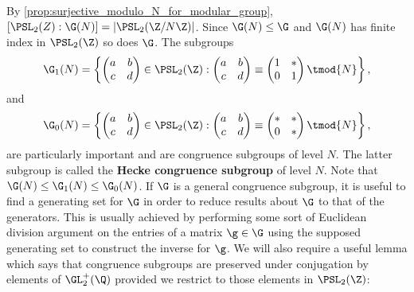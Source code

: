         By \cref{prop:surjective_modulo_N_for_modular_group}, $[\PSL_{2}(Z):\G(N)] = |\PSL_{2}(\Z/N\Z)|$. Since $\G(N) \le \G$ and $\G(N)$ has finite index in $\PSL_{2}(\Z)$ so does $\G$. The subgroups
      \[
        \G_{1}(N) = \left\{\begin{pmatrix} a & b \\ c & d \end{pmatrix} \in \PSL_{2}(\Z):\begin{pmatrix} a & b \\ c & d \end{pmatrix} \equiv \begin{pmatrix} 1 & \ast \\ 0 & 1 \end{pmatrix} \tmod{N}\right\},
      \]
      and
      \[
        \G_{0}(N) = \left\{\begin{pmatrix} a & b \\ c & d \end{pmatrix} \in \PSL_{2}(\Z):\begin{pmatrix} a & b \\ c & d \end{pmatrix} \equiv \begin{pmatrix} \ast & \ast \\ 0 & \ast \end{pmatrix} \tmod{N}\right\},
      \]
      are particularly important and are congruence subgroups of level $N$. The latter subgroup is called the \textbf{Hecke congruence subgroup} of level $N$. Note that $\G(N) \le \G_{1}(N) \le \G_{0}(N)$. If $\G$ is a general congruence subgroup, it is useful to find a generating set for $\G$ in order to reduce results about $\G$ to that of the generators. This is usually achieved by performing some sort of Euclidean division argument on the entries of a matrix $\g \in \G$ using the supposed generating set to construct the inverse for $\g$. We will also require a useful lemma which says that congruence subgroups are preserved under conjugation by elements of $\GL_{2}^{+}(\Q)$ provided we restrict to those elements in $\PSL_{2}(\Z)$:

